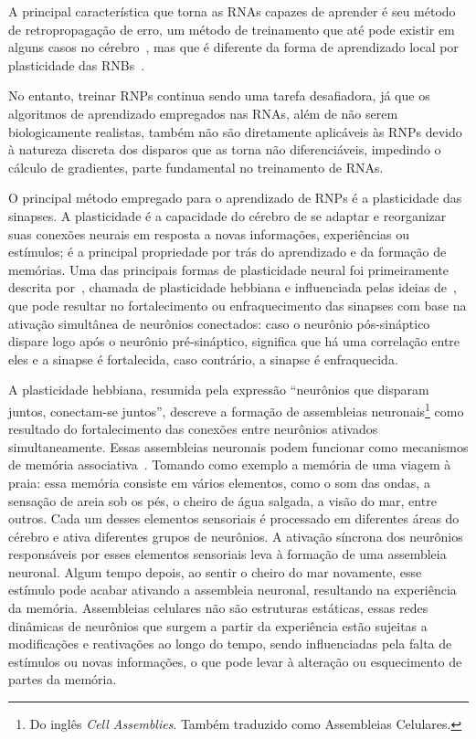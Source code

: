 A principal característica que torna as RNAs capazes de aprender é seu método de retropropagação de erro, um método de treinamento
que até pode existir em alguns casos no cérebro~\cite{lillicrapBackpropagation2020,songCan2020}, mas que é diferente da forma de
aprendizado local por plasticidade das RNBs~\cite{yamazakiSpiking2022}.

No entanto, treinar RNPs continua sendo uma tarefa desafiadora, já que os algoritmos de aprendizado empregados nas RNAs, além de
não serem biologicamente realistas, também não são diretamente aplicáveis às RNPs devido à natureza discreta dos disparos que as
torna não diferenciáveis, impedindo o cálculo de gradientes, parte fundamental no treinamento de RNAs.

O principal método empregado para o aprendizado de RNPs é a plasticidade das sinapses. A plasticidade é a capacidade do cérebro de
se adaptar e reorganizar suas conexões neurais em resposta a novas informações, experiências ou estímulos; é a principal
propriedade por trás do aprendizado e da formação de memórias. Uma das principais formas de plasticidade neural foi primeiramente
descrita por~\cite{hebbOrganization1949}, chamada de plasticidade hebbiana e influenciada pelas ideias
de~\cite{santiagoCroonian1894}, que pode resultar no fortalecimento ou enfraquecimento das sinapses com base na ativação
simultânea de neurônios conectados: caso o neurônio pós-sináptico dispare logo após o neurônio pré-sináptico, significa que há uma
correlação entre eles e a sinapse é fortalecida, caso contrário, a sinapse é enfraquecida.

A plasticidade hebbiana, resumida pela expressão ``neurônios que disparam juntos, co\-nectam-se juntos'', descreve a formação de
assembleias neuronais\footnote{Do inglês \textit{Cell Assemblies}. Também traduzido como Assembleias Celulares.} como resultado do
fortalecimento das conexões entre neurônios ativados simultaneamente. Essas assembleias neuronais podem funcionar como mecanismos
de memória associativa~\cite{sakuraiMultiple2018}. Tomando como exemplo a memória de uma viagem à praia: essa memória consiste em
vários elementos, como o som das ondas, a sensação de areia sob os pés, o cheiro de água salgada, a visão do mar, entre outros.
Cada um desses elementos sensoriais é processado em diferentes áreas do cérebro e ativa diferentes grupos de neurônios. A ativação
síncrona dos neurônios responsáveis por esses elementos sensoriais leva à formação de uma assembleia neuronal. Algum tempo depois, ao
sentir o cheiro do mar novamente, esse estímulo pode acabar ativando a assembleia neuronal, resultando na experiência da memória.
Assembleias celulares não são estruturas estáticas, essas redes dinâmicas de neurônios que surgem a partir da experiência estão
sujeitas a modificações e reativações ao longo do tempo, sendo influenciadas pela falta de estímulos ou novas informações, o que
pode levar à alteração ou esquecimento de partes da memória.

